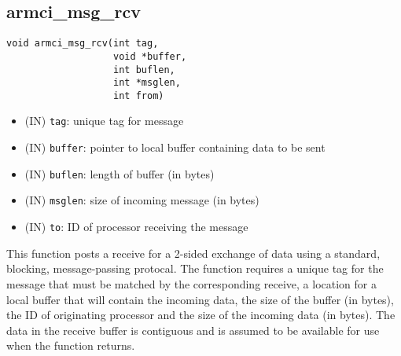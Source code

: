 \documentclass[12pt]{article}
\begin{document}
\subsection{armci\_msg\_rcv}
\begin{verbatim}
void armci_msg_rcv(int tag,
                   void *buffer,
                   int buflen,
                   int *msglen,
                   int from)
\end{verbatim}
\begin{itemize}
\item (IN) \texttt{tag}: unique tag for message
\item (IN) \texttt{buffer}: pointer to local buffer containing data to be sent
\item (IN) \texttt{buflen}: length of buffer (in bytes)
\item (IN) \texttt{msglen}: size of incoming message (in bytes)
\item (IN) \texttt{to}: ID of processor receiving the message
\end{itemize}
This function posts a receive for a 2-sided exchange of data using a standard,
blocking, message-passing protocal. The function requires a unique tag for the
message that must be matched by the corresponding receive, a location for a
local buffer that will contain the incoming data, the size of the buffer
(in bytes), the ID of originating processor and the size of the incoming data
(in bytes). The data in the receive buffer is contiguous and is assumed to be
available for use when the function returns.
\end{document}
